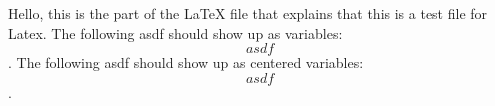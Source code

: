
  Hello, this is the part of the LaTeX file that explains that this is a test file for Latex.
  The following asdf should show up as variables: $$asdf$$.
  The following asdf should show up as centered variables: \[asdf\].
